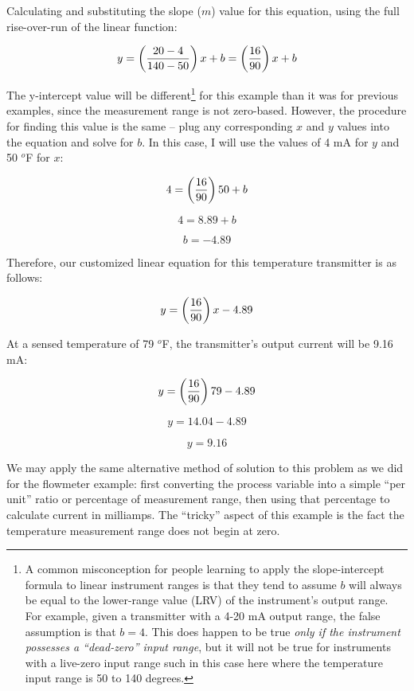 Calculating and substituting the slope ($m$) value for this equation, using the full rise-over-run of the linear function:

$$y = \left({{20 - 4} \over {140 - 50}}\right)x + b = \left({16 \over 90}\right)x + b$$

\filbreak

The y-intercept value will be different\footnote{A common misconception for people learning to apply the slope-intercept formula to linear instrument ranges is that they tend to assume $b$ will always be equal to the lower-range value (LRV) of the instrument's output range.  For example, given a transmitter with a 4-20 mA output range, the false assumption is that $b = 4$.  This does happen to be true \textit{only if the instrument possesses a ``dead-zero'' input range}, but it will not be true for instruments with a live-zero input range such in this case here where the temperature input range is 50 to 140 degrees.} for this example than it was for previous examples, since the measurement range is not zero-based.  However, the procedure for finding this value is the same -- plug any corresponding $x$ and $y$ values into the equation and solve for $b$.  In this case, I will use the values of 4 mA for $y$ and 50 $^{o}$F for $x$:

$$4 = \left({16 \over 90}\right)50 + b$$

$$4 = 8.89 + b$$

$$b = -4.89$$

\vskip 10pt

Therefore, our customized linear equation for this temperature transmitter is as follows:

$$y = \left({16 \over 90}\right)x - 4.89$$

At a sensed temperature of 79 $^{o}$F, the transmitter's output current will be 9.16 mA:

$$y = \left({16 \over 90}\right)79 - 4.89$$

$$y = 14.04 - 4.89$$

$$y = 9.16$$

\vskip 10pt

\filbreak

We may apply the same alternative method of solution to this problem as we did for the flowmeter example: first converting the process variable into a simple ``per unit'' ratio or percentage of measurement range, then using that percentage to calculate current in milliamps.  The ``tricky'' aspect of this example is the fact the temperature measurement range does not begin at zero.

